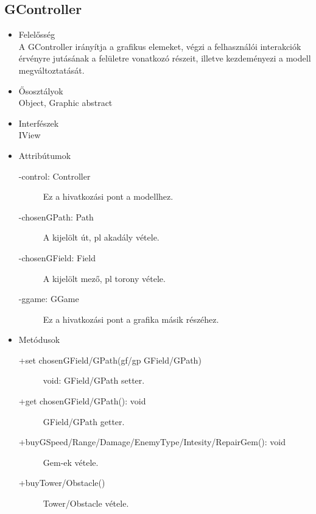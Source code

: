 \subsection{GController}
\begin{itemize}
\item Felelősség\\
A GController irányítja a grafikus elemeket, végzi a felhasználói interakciók érvényre jutásának a felületre vonatkozó részeit, illetve kezdeményezi a modell megváltoztatását.
\item Ősosztályok\\
Object, Graphic abstract
\item Interfészek\\
IView
\item Attribútumok\\
	\begin{description}
		\item[-control: Controller] Ez a hivatkozási pont a modellhez.
		\item[-chosenGPath: Path] A kijelölt út, pl akadály vétele.
		\item[-chosenGField: Field] A kijelölt mező, pl torony vétele.
		\item[-ggame: GGame] Ez a hivatkozási pont a grafika másik részéhez.
\end{description}
\item Metódusok\\
	\begin{description}
		\item[+set chosenGField/GPath(gf/gp GField/GPath)] void: GField/GPath setter.
		\item[+get chosenGField/GPath(): void] GField/GPath getter.
		\item[+buyGSpeed/Range/Damage/EnemyType/Intesity/RepairGem(): void] Gem-ek vétele.
		\item[+buyTower/Obstacle()] Tower/Obstacle vétele.
	\end{description}
\end{itemize}

